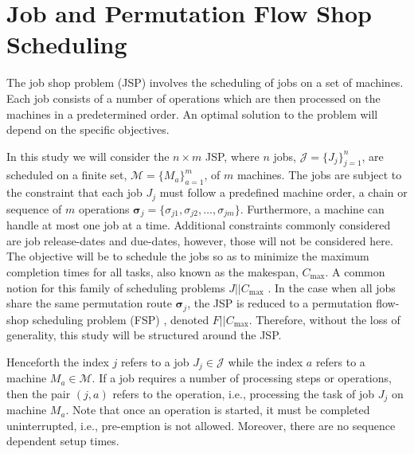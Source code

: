 \documentclass[smallextended]{svjour3}
\renewcommand{\vsigma}{\bm \sigma}
\begin{document}
	
	\section{Job and Permutation Flow Shop Scheduling}\label{sec:problemdef}
	The job shop problem (JSP) involves the scheduling of jobs on a set of machines. Each job consists of a number of operations which are then processed on the machines in a predetermined order. An optimal solution to the problem will depend on the specific objectives. 
	
	In this study we will consider the $n\times m$ JSP,  where $n$ jobs, $\mathcal{J}=\{J_j\}_{j=1}^n$, are scheduled on a finite set, $\mathcal{M}=\{M_a\}_{a=1}^m$, of $m$ machines. The jobs are subject to the constraint that each job $J_j$ must follow a predefined machine order, a chain or sequence of $m$ operations $\vsigma_j=\{\sigma_{j1},\sigma_{j2},\dotsc,\sigma_{jm}\}$. Furthermore, a machine can handle at most one job at a time. Additional constraints commonly considered are job release-dates and due-dates, however, those will not be considered here. 
	The objective will be to schedule the jobs so as to minimize the maximum completion times for all tasks, also known as the makespan, $C_{\max}$. A common notion for this family of scheduling problems $J||C_{\max}$ \citep{Pinedo08}. 
	In the case when all jobs share the same permutation route $\vsigma_j$, the JSP is reduced to a permutation flow-shop scheduling problem (FSP) \citep{Guinet1998,Tay08}, denoted $F||C_{\max}$. Therefore, without the loss of generality, this study will be structured around the JSP. 
	
	
	Henceforth the index $j$ refers to a job $J_j\in\mathcal{J}$ while the index $a$ refers to a machine $M_a\in\mathcal{M}$. If a job requires a number of processing steps or operations, then the pair $(j,a)$ refers to the operation, i.e., processing the task of job $J_j$ on machine $M_a$. Note that once an operation is started, it must be completed uninterrupted, i.e., pre-emption is not allowed. Moreover, there are no sequence dependent setup times.
	
	
\end{document}
